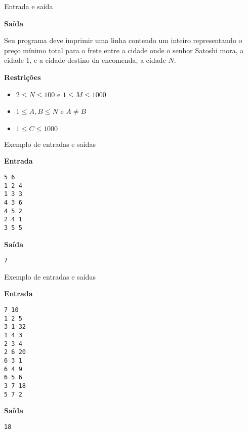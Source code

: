 \begin{frame}[fragile]{Entrada e saída}

\textbf{Saída}

Seu programa deve imprimir uma linha contendo um inteiro representando o preço mínimo total para o
frete entre a cidade onde o senhor Satoshi mora, a cidade 1, e a cidade destino da encomenda, a
cidade $N$.

\vspace{0.1in}

\textbf{Restrições}

\begin{itemize}
    \item $2\leq N\leq 100$ e $1\leq M\leq 1000$
    \item $1\leq A, B\leq N$ e $A\neq B$
    \item $1\leq C\leq 1000$
\end{itemize}

\end{frame}

\begin{frame}[fragile]{Exemplo de entradas e saídas}

\begin{minipage}[t]{0.45\textwidth}
\textbf{Entrada}
\begin{verbatim}
5 6
1 2 4
1 3 3
4 3 6
4 5 2
2 4 1
3 5 5
\end{verbatim}
\end{minipage}
\begin{minipage}[t]{0.5\textwidth}
\textbf{Saída}
\begin{verbatim}
7
\end{verbatim}
\end{minipage}
\end{frame}

\begin{frame}[fragile]{Exemplo de entradas e saídas}

\begin{minipage}[t]{0.45\textwidth}
\textbf{Entrada}
\begin{verbatim}
7 10
1 2 5
3 1 32
1 4 3
2 3 4
2 6 20
6 3 1
6 4 9
6 5 6
3 7 18
5 7 2
\end{verbatim}
\end{minipage}
\begin{minipage}[t]{0.5\textwidth}
\textbf{Saída}
\begin{verbatim}
18
\end{verbatim}
\end{minipage}
\end{frame}


